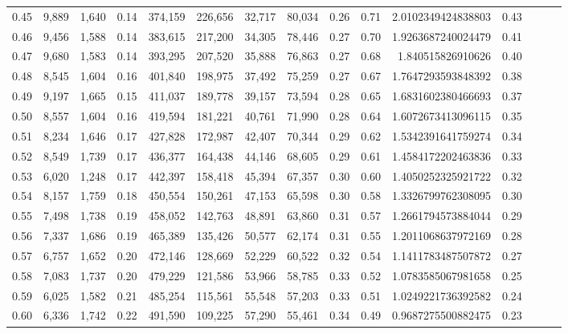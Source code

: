 \begin{tabular}{rrrrrrrrrrrrrrr}
0.45 &   9,889 &  1,640 &  0.14 &  374,159 &  226,656 &   32,717 &   80,034 &  0.26 &  0.71 &    2.0102349424838803 &      0.43 \\
0.46 &   9,456 &  1,588 &  0.14 &  383,615 &  217,200 &   34,305 &   78,446 &  0.27 &  0.70 &    1.9263687240024479 &      0.41 \\
0.47 &   9,680 &  1,583 &  0.14 &  393,295 &  207,520 &   35,888 &   76,863 &  0.27 &  0.68 &     1.840515826910626 &      0.40 \\
0.48 &   8,545 &  1,604 &  0.16 &  401,840 &  198,975 &   37,492 &   75,259 &  0.27 &  0.67 &    1.7647293593848392 &      0.38 \\
0.49 &   9,197 &  1,665 &  0.15 &  411,037 &  189,778 &   39,157 &   73,594 &  0.28 &  0.65 &    1.6831602380466693 &      0.37 \\
0.50 &   8,557 &  1,604 &  0.16 &  419,594 &  181,221 &   40,761 &   71,990 &  0.28 &  0.64 &    1.6072673413096115 &      0.35 \\
0.51 &   8,234 &  1,646 &  0.17 &  427,828 &  172,987 &   42,407 &   70,344 &  0.29 &  0.62 &    1.5342391641759274 &      0.34 \\
0.52 &   8,549 &  1,739 &  0.17 &  436,377 &  164,438 &   44,146 &   68,605 &  0.29 &  0.61 &    1.4584172202463836 &      0.33 \\
0.53 &   6,020 &  1,248 &  0.17 &  442,397 &  158,418 &   45,394 &   67,357 &  0.30 &  0.60 &    1.4050252325921722 &      0.32 \\
0.54 &   8,157 &  1,759 &  0.18 &  450,554 &  150,261 &   47,153 &   65,598 &  0.30 &  0.58 &    1.3326799762308095 &      0.30 \\
0.55 &   7,498 &  1,738 &  0.19 &  458,052 &  142,763 &   48,891 &   63,860 &  0.31 &  0.57 &    1.2661794573884044 &      0.29 \\
0.56 &   7,337 &  1,686 &  0.19 &  465,389 &  135,426 &   50,577 &   62,174 &  0.31 &  0.55 &    1.2011068637972169 &      0.28 \\
0.57 &   6,757 &  1,652 &  0.20 &  472,146 &  128,669 &   52,229 &   60,522 &  0.32 &  0.54 &    1.1411783487507872 &      0.27 \\
0.58 &   7,083 &  1,737 &  0.20 &  479,229 &  121,586 &   53,966 &   58,785 &  0.33 &  0.52 &    1.0783585067981658 &      0.25 \\
0.59 &   6,025 &  1,582 &  0.21 &  485,254 &  115,561 &   55,548 &   57,203 &  0.33 &  0.51 &    1.0249221736392582 &      0.24 \\
0.60 &   6,336 &  1,742 &  0.22 &  491,590 &  109,225 &   57,290 &   55,461 &  0.34 &  0.49 &    0.9687275500882475 &      0.23 \\

\end{tabular}
